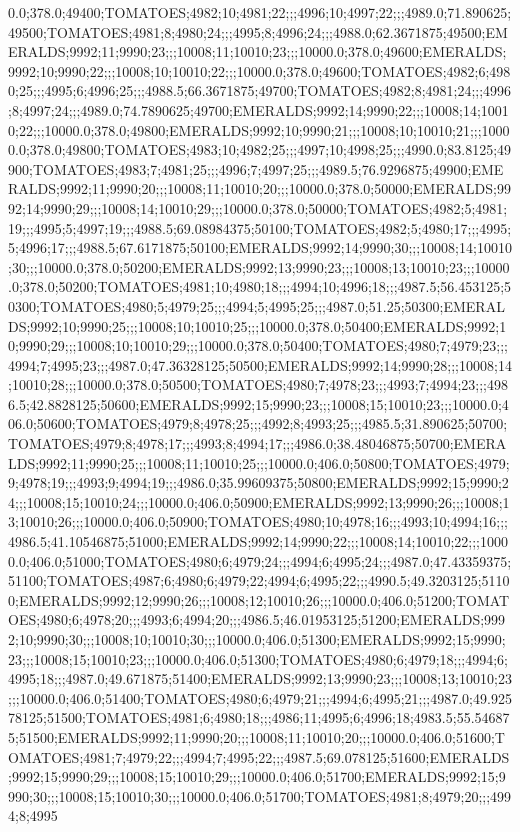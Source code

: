 0.0;378.0;49400;TOMATOES;4982;10;4981;22;;;4996;10;4997;22;;;4989.0;71.890625;49500;TOMATOES;4981;8;4980;24;;;4995;8;4996;24;;;4988.0;62.3671875;49500;EMERALDS;9992;11;9990;23;;;10008;11;10010;23;;;10000.0;378.0;49600;EMERALDS;9992;10;9990;22;;;10008;10;10010;22;;;10000.0;378.0;49600;TOMATOES;4982;6;4980;25;;;4995;6;4996;25;;;4988.5;66.3671875;49700;TOMATOES;4982;8;4981;24;;;4996;8;4997;24;;;4989.0;74.7890625;49700;EMERALDS;9992;14;9990;22;;;10008;14;10010;22;;;10000.0;378.0;49800;EMERALDS;9992;10;9990;21;;;10008;10;10010;21;;;10000.0;378.0;49800;TOMATOES;4983;10;4982;25;;;4997;10;4998;25;;;4990.0;83.8125;49900;TOMATOES;4983;7;4981;25;;;4996;7;4997;25;;;4989.5;76.9296875;49900;EMERALDS;9992;11;9990;20;;;10008;11;10010;20;;;10000.0;378.0;50000;EMERALDS;9992;14;9990;29;;;10008;14;10010;29;;;10000.0;378.0;50000;TOMATOES;4982;5;4981;19;;;4995;5;4997;19;;;4988.5;69.08984375;50100;TOMATOES;4982;5;4980;17;;;4995;5;4996;17;;;4988.5;67.6171875;50100;EMERALDS;9992;14;9990;30;;;10008;14;10010;30;;;10000.0;378.0;50200;EMERALDS;9992;13;9990;23;;;10008;13;10010;23;;;10000.0;378.0;50200;TOMATOES;4981;10;4980;18;;;4994;10;4996;18;;;4987.5;56.453125;50300;TOMATOES;4980;5;4979;25;;;4994;5;4995;25;;;4987.0;51.25;50300;EMERALDS;9992;10;9990;25;;;10008;10;10010;25;;;10000.0;378.0;50400;EMERALDS;9992;10;9990;29;;;10008;10;10010;29;;;10000.0;378.0;50400;TOMATOES;4980;7;4979;23;;;4994;7;4995;23;;;4987.0;47.36328125;50500;EMERALDS;9992;14;9990;28;;;10008;14;10010;28;;;10000.0;378.0;50500;TOMATOES;4980;7;4978;23;;;4993;7;4994;23;;;4986.5;42.8828125;50600;EMERALDS;9992;15;9990;23;;;10008;15;10010;23;;;10000.0;406.0;50600;TOMATOES;4979;8;4978;25;;;4992;8;4993;25;;;4985.5;31.890625;50700;TOMATOES;4979;8;4978;17;;;4993;8;4994;17;;;4986.0;38.48046875;50700;EMERALDS;9992;11;9990;25;;;10008;11;10010;25;;;10000.0;406.0;50800;TOMATOES;4979;9;4978;19;;;4993;9;4994;19;;;4986.0;35.99609375;50800;EMERALDS;9992;15;9990;24;;;10008;15;10010;24;;;10000.0;406.0;50900;EMERALDS;9992;13;9990;26;;;10008;13;10010;26;;;10000.0;406.0;50900;TOMATOES;4980;10;4978;16;;;4993;10;4994;16;;;4986.5;41.10546875;51000;EMERALDS;9992;14;9990;22;;;10008;14;10010;22;;;10000.0;406.0;51000;TOMATOES;4980;6;4979;24;;;4994;6;4995;24;;;4987.0;47.43359375;51100;TOMATOES;4987;6;4980;6;4979;22;4994;6;4995;22;;;4990.5;49.3203125;51100;EMERALDS;9992;12;9990;26;;;10008;12;10010;26;;;10000.0;406.0;51200;TOMATOES;4980;6;4978;20;;;4993;6;4994;20;;;4986.5;46.01953125;51200;EMERALDS;9992;10;9990;30;;;10008;10;10010;30;;;10000.0;406.0;51300;EMERALDS;9992;15;9990;23;;;10008;15;10010;23;;;10000.0;406.0;51300;TOMATOES;4980;6;4979;18;;;4994;6;4995;18;;;4987.0;49.671875;51400;EMERALDS;9992;13;9990;23;;;10008;13;10010;23;;;10000.0;406.0;51400;TOMATOES;4980;6;4979;21;;;4994;6;4995;21;;;4987.0;49.92578125;51500;TOMATOES;4981;6;4980;18;;;4986;11;4995;6;4996;18;4983.5;55.546875;51500;EMERALDS;9992;11;9990;20;;;10008;11;10010;20;;;10000.0;406.0;51600;TOMATOES;4981;7;4979;22;;;4994;7;4995;22;;;4987.5;69.078125;51600;EMERALDS;9992;15;9990;29;;;10008;15;10010;29;;;10000.0;406.0;51700;EMERALDS;9992;15;9990;30;;;10008;15;10010;30;;;10000.0;406.0;51700;TOMATOES;4981;8;4979;20;;;4994;8;4995